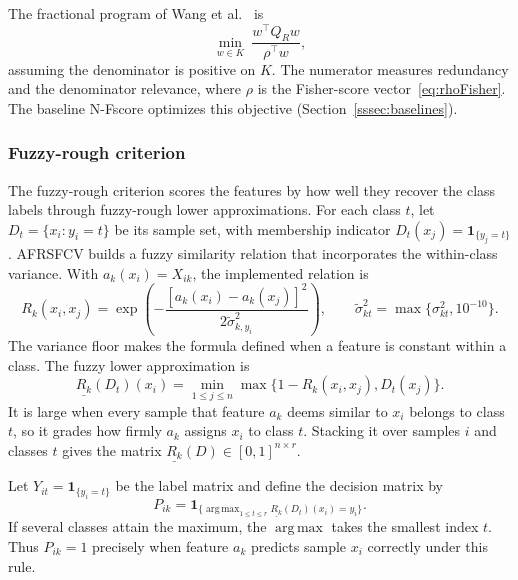 \documentclass[]{interact}
\theoremstyle{plain}
\theoremstyle{definition}
\theoremstyle{remark}
\DeclareMathOperator*{\argmax}{arg\,max}
\begin{document}
The fractional program of Wang et al.~\citep{wang2021fractional} is
\begin{equation}\label{eq:wangOrig}
\min_{w\in K}\ \frac{w^{\top}Q_Rw}{\rho^{\top}w},
\end{equation}
assuming the denominator is positive on $K$. The numerator measures redundancy and the denominator relevance, where $\rho$ is the Fisher-score vector~\eqref{eq:rhoFisher}. The baseline N-Fscore optimizes this objective (Section~\ref{sssec:baselines}).

\subsubsection{Fuzzy-rough criterion}\label{ssec:afrsfcv}\label{sssec:afrsfcv-inputs}\label{sssec:afrsfcv-model}
The fuzzy-rough criterion scores the features by how well they recover the class labels through fuzzy-rough lower approximations. For each class $t$, let $D_t=\{x_i:y_i=t\}$ be its sample set, with membership indicator $D_t(x_j)=\mathbf1_{\{y_j=t\}}$. AFRSFCV builds a fuzzy similarity relation that incorporates the within-class variance. With $a_k(x_i)=X_{ik}$, the implemented relation is
\begin{equation}\label{eq:simRel}
R_k(x_i,x_j)=\exp\!\left(-\frac{[a_k(x_i)-a_k(x_j)]^2}{2\widetilde\sigma_{k,y_i}^2}\right),
\qquad \widetilde\sigma_{kt}^2=\max\{\sigma_{kt}^2,10^{-10}\}.
\end{equation}
The variance floor makes the formula defined when a feature is constant within a class. The fuzzy lower approximation is
\begin{equation}\label{eq:lower}
\underline{R_k}(D_t)(x_i)=\min_{1\le j\le n}\max\{1-R_k(x_i,x_j),D_t(x_j)\}.
\end{equation}
It is large when every sample that feature $a_k$ deems similar to $x_i$ belongs to class $t$, so it grades how firmly $a_k$ assigns $x_i$ to class $t$. Stacking it over samples $i$ and classes $t$ gives the matrix $\underline{R_k}(D)\in[0,1]^{n\times r}$.

Let $Y_{it}=\mathbf1_{\{y_i=t\}}$ be the label matrix and define the decision matrix by
\begin{equation}\label{eq:Pmat}
P_{ik}=\mathbf1_{\{\argmax_{1\le t\le r}\underline{R_k}(D_t)(x_i)=y_i\}}.
\end{equation}
If several classes attain the maximum, the $\argmax$ takes the smallest index $t$. Thus $P_{ik}=1$ precisely when feature $a_k$ predicts sample $x_i$ correctly under this rule.
\end{document}

